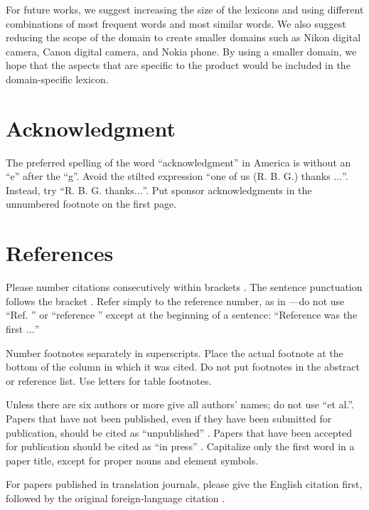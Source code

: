 \documentclass[a4paper,conference]{IEEEtran}
\begin{document}
For future works, we suggest increasing the size of the lexicons and using different combinations of most frequent words and most similar words. We also suggest reducing the scope of the domain to create smaller domains such as Nikon digital camera, Canon digital camera, and Nokia phone. By using a smaller domain, we hope that the aspects that are specific to the product would be included in the domain-specific lexicon.


\section*{Acknowledgment}

The preferred spelling of the word ``acknowledgment'' in America is without 
an ``e'' after the ``g''. Avoid the stilted expression ``one of us (R. B. 
G.) thanks $\ldots$''. Instead, try ``R. B. G. thanks$\ldots$''. Put sponsor 
acknowledgments in the unnumbered footnote on the first page.

\section*{References}

Please number citations consecutively within brackets \cite{b1}. The 
sentence punctuation follows the bracket \cite{b2}. Refer simply to the reference 
number, as in \cite{b3}---do not use ``Ref. \cite{b3}'' or ``reference \cite{b3}'' except at 
the beginning of a sentence: ``Reference \cite{b3} was the first $\ldots$''

Number footnotes separately in superscripts. Place the actual footnote at 
the bottom of the column in which it was cited. Do not put footnotes in the 
abstract or reference list. Use letters for table footnotes.

Unless there are six authors or more give all authors' names; do not use 
``et al.''. Papers that have not been published, even if they have been 
submitted for publication, should be cited as ``unpublished'' \cite{b4}. Papers 
that have been accepted for publication should be cited as ``in press'' \cite{b5}. 
Capitalize only the first word in a paper title, except for proper nouns and 
element symbols.

For papers published in translation journals, please give the English 
citation first, followed by the original foreign-language citation \cite{b6}.
\end{document}
